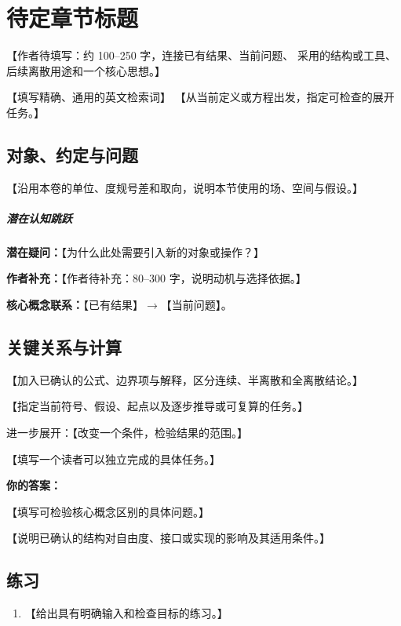 \chapter{待定章节标题}\label{template:v2}
\begin{chaptersummary}
【作者待填写：约 100--250 字，连接已有结果、当前问题、
采用的结构或工具、后续离散用途和一个核心思想。】
\end{chaptersummary}
{【填写精确、通用的英文检索词】}
{【从当前定义或方程出发，指定可检查的展开任务。】}

\section{对象、约定与问题}
【沿用本卷的单位、度规号差和取向，说明本节使用的场、空间与假设。】

\paragraph{潜在认知跳跃}
\textbf{潜在疑问：}【为什么此处需要引入新的对象或操作？】\par
\textbf{作者补充：}【作者待补充：80--300 字，说明动机与选择依据。】\par
\textbf{核心概念联系：}【已有结果】$\longrightarrow$【当前问题】。

\section{关键关系与计算}
【加入已确认的公式、边界项与解释，区分连续、半离散和全离散结论。】
\begin{askai}
【指定当前符号、假设、起点以及逐步推导或可复算的任务。】

进一步展开：【改变一个条件，检验结果的范围。】
\end{askai}

\begin{studentinput}
【填写一个读者可以独立完成的具体任务。】

\textbf{你的答案：}\par\vspace{1cm}
\end{studentinput}
\begin{checkpoint}
【填写可检验核心概念区别的具体问题。】
\end{checkpoint}
\begin{engineernote}
【说明已确认的结构对自由度、接口或实现的影响及其适用条件。】
\end{engineernote}

\section{练习}
\begin{enumerate}
\item 【给出具有明确输入和检查目标的练习。】
\end{enumerate}
